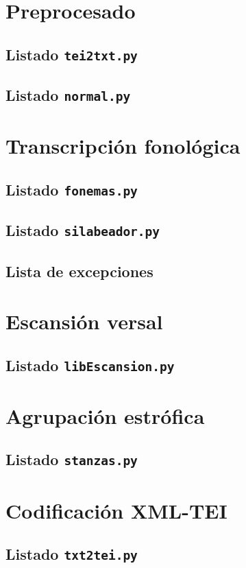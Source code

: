 \section{Preprocesado}\label{list:tei2normal}
\subsection*{Listado \texttt{tei2txt.py}}


\subsection*{Listado \texttt{normal.py}}


\section{Transcripción fonológica}\label{list:fonemas}
\subsection*{Listado \texttt{fonemas.py}}


\subsection*{Listado \texttt{silabeador.py}}\label{list:silabeador}


\subsection*{Lista de excepciones}

\section{Escansión versal}\label{list:libscansion}
\subsection*{Listado \texttt{libEscansion.py}}


\section{Agrupación estrófica}\label{list:stanzas}
\subsection*{Listado \texttt{stanzas.py}}


\section{Codificación XML-TEI}\label{list2:txt2tei}
\subsection*{Listado \texttt{txt2tei.py}}

\cleardoublepage
